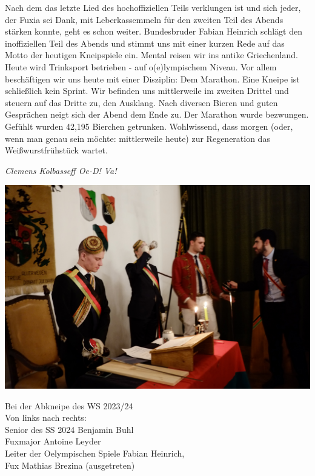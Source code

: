 \begin{multicols}{2}
Nach dem das letzte Lied des hochoffiziellen Teils verklungen ist und sich jeder, der Fuxia sei Dank, mit Leberkassemmeln für den zweiten Teil des Abends stärken konnte, geht es schon weiter.
Bundesbruder Fabian Heinrich schlägt den inoffiziellen Teil des Abends und stimmt uns mit einer kurzen Rede auf das Motto der heutigen Kneipspiele ein. Mental reisen wir ins antike Griechenland. Heute wird Trinksport betrieben - auf o(e)lympischem Niveau. Vor allem beschäftigen wir uns heute mit einer Disziplin: Dem Marathon. Eine Kneipe ist schließlich kein Sprint. Wir befinden uns mittlerweile im zweiten Drittel und steuern auf das Dritte zu, den Ausklang. Nach diversen Bieren und guten Gesprächen neigt sich der Abend dem Ende zu. Der Marathon wurde bezwungen. Gefühlt wurden 42,195 Bierchen getrunken. 
Wohlwissend, dass morgen (oder, wenn man genau sein möchte: mittlerweile heute) zur Regeneration das Weißwurstfrühstück wartet. 

	\begin{flushright}
		\hfill\emph{Clemens Kolbasseff Oe-D! Va!}
	\end{flushright}
\end{multicols}


\begin{figurehere}
	\begin{center}
		\includegraphics[width=.8\linewidth]{./Bilder/Oelympische Spiele/DSCF6082.jpeg} 
		\caption{Bei der Abkneipe des WS 2023/24\\Von links nach rechts:\\ Senior des SS 2024 Benjamin Buhl \\Fuxmajor Antoine Leyder\\Leiter der Oelympischen Spiele Fabian Heinrich, \\Fux Mathias Brezina (ausgetreten)\\
		} 
	\end{center}
\end{figurehere}

%
